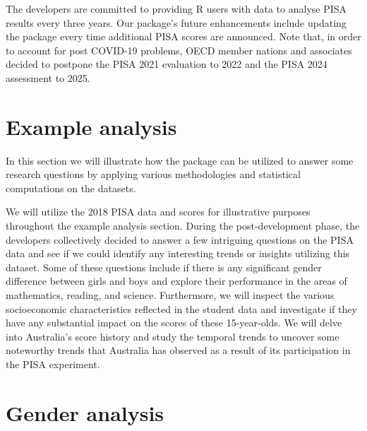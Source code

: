 The  developers are committed to providing R users with data to analyse PISA results every three years. Our package's future enhancements include updating the package every time additional PISA scores are announced. Note that, in order to account for post COVID-19 problems, OECD member nations and associates decided to postpone the PISA 2021 evaluation to 2022 and the PISA 2024 assessment to 2025.

\section{Example analysis}\label{example-analysis}

In this section we will illustrate how the  package can be utilized to answer some research questions by applying various methodologies and statistical computations on the  datasets.

We will utilize the 2018 PISA data and scores for illustrative purposes throughout the example analysis section. During the post-development phase, the  developers collectively decided to answer a few intriguing questions on the PISA data and see if we could identify any interesting trends or insights utilizing this dataset. Some of these questions include if there is any significant gender difference between girls and boys and explore their performance in the areas of mathematics, reading, and science. Furthermore, we will inspect the various socioeconomic characteristics reflected in the student data and investigate if they have any substantial impact on the scores of these 15-year-olds. We will delve into Australia's score history and study the temporal trends to uncover some noteworthy trends that Australia has observed as a result of its participation in the PISA experiment.

\section{Gender analysis}\label{gender-analysis}

